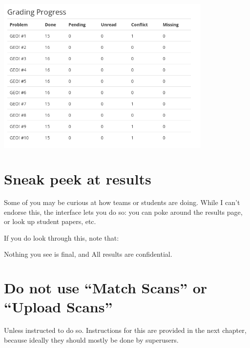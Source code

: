 \begin{center}
	\includegraphics[width=0.8\textwidth]{images/progress.png}
\end{center}

\section{Sneak peek at results}
Some of you may be curious at how teams or students are doing.
While I can't endorse this, the interface lets you do so:
you can poke around the results page,
or look up student papers, etc.

If you do look through this, note that:
\begin{itemize}
	\ii Nothing you see is final, and
	\ii All results are confidential.
\end{itemize}

\section{Do not use ``Match Scans'' or ``Upload Scans''}
Unless instructed to do so.
Instructions for this are provided in the next chapter,
because ideally they should mostly be done by superusers.
